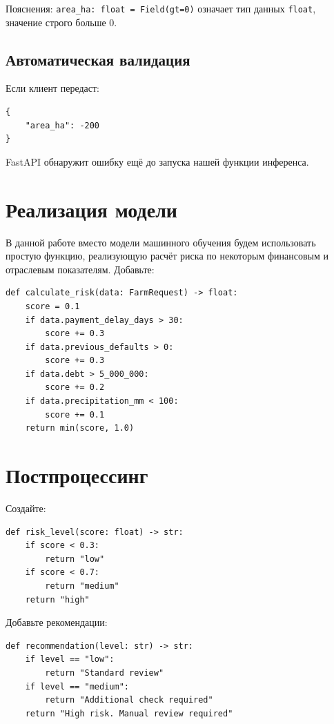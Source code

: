 \documentclass[12pt,a4paper]{article}
\begin{document}
Пояснения: \texttt{area\_ha: float = Field(gt=0)} означает тип данных \texttt{float}, значение строго больше 0.

\subsection*{Автоматическая валидация}

Если клиент передаст:

\begin{lstlisting}[caption={Некорректный запрос}]
{
    "area_ha": -200
}
\end{lstlisting}

FastAPI обнаружит ошибку ещё до запуска нашей функции инференса.

\section{Реализация модели}

В данной работе вместо модели машинного обучения будем использовать простую функцию, реализующую расчёт риска по некоторым финансовым и отраслевым показателям. Добавьте:

\begin{lstlisting}[caption={Функция расчёта риска}]
def calculate_risk(data: FarmRequest) -> float:
    score = 0.1
    if data.payment_delay_days > 30:
        score += 0.3
    if data.previous_defaults > 0:
        score += 0.3
    if data.debt > 5_000_000:
        score += 0.2
    if data.precipitation_mm < 100:
        score += 0.1
    return min(score, 1.0)
\end{lstlisting}

\section{Постпроцессинг}

Создайте:

\begin{lstlisting}[caption={Функция risk\_level}]
def risk_level(score: float) -> str:
    if score < 0.3:
        return "low"
    if score < 0.7:
        return "medium"
    return "high"
\end{lstlisting}

Добавьте рекомендации:

\begin{lstlisting}[caption={Функция recommendation}]
def recommendation(level: str) -> str:
    if level == "low":
        return "Standard review"
    if level == "medium":
        return "Additional check required"
    return "High risk. Manual review required"
\end{lstlisting}
\end{document}
